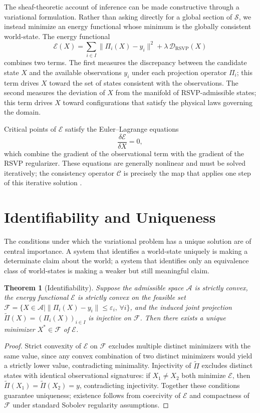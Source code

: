 \documentclass[11pt, oneside]{article}
\newtheorem{theorem}{Theorem}
\begin{document}
The sheaf-theoretic account of inference can be made constructive through a variational formulation. Rather than asking directly for a global section of $\mathcal{S}$, we instead minimize an energy functional whose minimum is the globally consistent world-state. The energy functional
\[
\mathcal{E}(X) = \sum_{i \in I} \|\Pi_i(X) - y_i\|^2 + \lambda \, \mathcal{D}_{\mathrm{RSVP}}(X)
\]
combines two terms. The first measures the discrepancy between the candidate state $X$ and the available observations $y_i$ under each projection operator $\Pi_i$; this term drives $X$ toward the set of states consistent with the observations. The second measures the deviation of $X$ from the manifold of RSVP-admissible states; this term drives $X$ toward configurations that satisfy the physical laws governing the domain.

Critical points of $\mathcal{E}$ satisfy the Euler--Lagrange equations
\[
\frac{\delta \mathcal{E}}{\delta X} = 0,
\]
which combine the gradient of the observational term with the gradient of the RSVP regularizer. These equations are generally nonlinear and must be solved iteratively; the consistency operator $\mathcal{C}$ is precisely the map that applies one step of this iterative solution \cite{evans2010partial}.

\section{Identifiability and Uniqueness}

The conditions under which the variational problem has a unique solution are of central importance. A system that identifies a world-state uniquely is making a determinate claim about the world; a system that identifies only an equivalence class of world-states is making a weaker but still meaningful claim.

\begin{theorem}[Identifiability]
Suppose the admissible space $\mathcal{A}$ is strictly convex, the energy functional $\mathcal{E}$ is strictly convex on the feasible set $\mathcal{F} = \{ X \in \mathcal{A} \mid \|\Pi_i(X) - y_i\| \leq \varepsilon_i,\, \forall i \}$, and the induced joint projection $\tilde{\Pi}(X) = (\Pi_i(X))_{i \in I}$ is injective on $\mathcal{F}$. Then there exists a unique minimizer $X^\ast \in \mathcal{F}$ of $\mathcal{E}$.
\end{theorem}

\begin{proof}
Strict convexity of $\mathcal{E}$ on $\mathcal{F}$ excludes multiple distinct minimizers with the same value, since any convex combination of two distinct minimizers would yield a strictly lower value, contradicting minimality. Injectivity of $\tilde{\Pi}$ excludes distinct states with identical observational signatures: if $X_1 \neq X_2$ both minimize $\mathcal{E}$, then $\tilde{\Pi}(X_1) = \tilde{\Pi}(X_2) = y$, contradicting injectivity. Together these conditions guarantee uniqueness; existence follows from coercivity of $\mathcal{E}$ and compactness of $\mathcal{F}$ under standard Sobolev regularity assumptions.
\end{proof}
\end{document}
